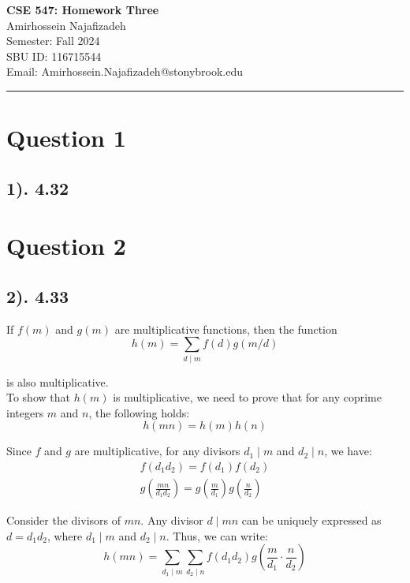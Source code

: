 \documentclass[12pt]{article}
\begin{document}
\begin{center}
    {\LARGE\textbf{CSE 547: Homework Three}} \\[1em]
    {\large Amirhossein Najafizadeh} \\[1em]
    Semester: Fall 2024 \\ 
    SBU ID: 116715544 \\
    Email: Amirhossein.Najafizadeh@stonybrook.edu \\[1em]
    \noindent\rule{\textwidth}{0.6pt}
\end{center}

\section*{Question 1}
\subsection*{1). 4.32}

\section*{Question 2}
\subsection*{2). 4.33}
If \( f(m) \) and \( g(m) \) are multiplicative functions, then the function
\[ 
    h(m) = \sum_{d \mid m} f(d) g(m/d)
\]

is also multiplicative. \\

To show that \( h(m) \) is multiplicative, we need to prove that for any coprime integers \( m \) and \( n \), the following holds:
\[ 
    h(mn) = h(m)h(n)
\]

Since \( f \) and \( g \) are multiplicative, for any divisors \( d_1 \mid m \) and \( d_2 \mid n \), we have:
\begin{gather*}
    f(d_1 d_2) = f(d_1)f(d_2) \\
    g\left(\frac{mn}{d_1 d_2}\right) = g\left(\frac{m}{d_1}\right)g\left(\frac{n}{d_2}\right)
\end{gather*}

Consider the divisors of \( mn \). Any divisor \( d \mid mn \) can be uniquely expressed as \( d = d_1 d_2 \), where \( d_1 \mid m \) and \( d_2 \mid n \).
Thus, we can write:
\[
    h(mn) = \sum_{d_1 \mid m} \sum_{d_2 \mid n} f(d_1 d_2) g\left(\frac{m}{d_1} \cdot \frac{n}{d_2}\right)
\]
\end{document}
